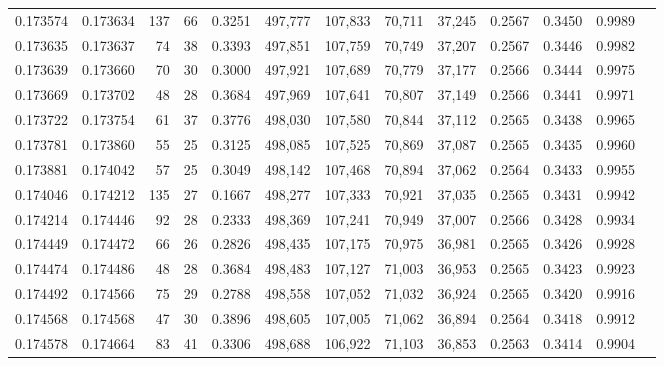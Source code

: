 \begin{tabular}{rrrrrrrrrrrrr}
0.173574 & 0.173634 &   137 &  66 &                                     0.3251 & 497,777 & 107,833 &  70,711 &  37,245 & 0.2567 & 0.3450 & 0.9989 \\
0.173635 & 0.173637 &    74 &  38 &                                     0.3393 & 497,851 & 107,759 &  70,749 &  37,207 & 0.2567 & 0.3446 & 0.9982 \\
0.173639 & 0.173660 &    70 &  30 &                                     0.3000 & 497,921 & 107,689 &  70,779 &  37,177 & 0.2566 & 0.3444 & 0.9975 \\
0.173669 & 0.173702 &    48 &  28 &                                     0.3684 & 497,969 & 107,641 &  70,807 &  37,149 & 0.2566 & 0.3441 & 0.9971 \\
0.173722 & 0.173754 &    61 &  37 &                                     0.3776 & 498,030 & 107,580 &  70,844 &  37,112 & 0.2565 & 0.3438 & 0.9965 \\
0.173781 & 0.173860 &    55 &  25 &                                     0.3125 & 498,085 & 107,525 &  70,869 &  37,087 & 0.2565 & 0.3435 & 0.9960 \\
0.173881 & 0.174042 &    57 &  25 &                                     0.3049 & 498,142 & 107,468 &  70,894 &  37,062 & 0.2564 & 0.3433 & 0.9955 \\
0.174046 & 0.174212 &   135 &  27 &                                     0.1667 & 498,277 & 107,333 &  70,921 &  37,035 & 0.2565 & 0.3431 & 0.9942 \\
0.174214 & 0.174446 &    92 &  28 &                                     0.2333 & 498,369 & 107,241 &  70,949 &  37,007 & 0.2566 & 0.3428 & 0.9934 \\
0.174449 & 0.174472 &    66 &  26 &                                     0.2826 & 498,435 & 107,175 &  70,975 &  36,981 & 0.2565 & 0.3426 & 0.9928 \\
0.174474 & 0.174486 &    48 &  28 &                                     0.3684 & 498,483 & 107,127 &  71,003 &  36,953 & 0.2565 & 0.3423 & 0.9923 \\
0.174492 & 0.174566 &    75 &  29 &                                     0.2788 & 498,558 & 107,052 &  71,032 &  36,924 & 0.2565 & 0.3420 & 0.9916 \\
0.174568 & 0.174568 &    47 &  30 &                                     0.3896 & 498,605 & 107,005 &  71,062 &  36,894 & 0.2564 & 0.3418 & 0.9912 \\
0.174578 & 0.174664 &    83 &  41 &                                     0.3306 & 498,688 & 106,922 &  71,103 &  36,853 & 0.2563 & 0.3414 & 0.9904 \\

\end{tabular}
